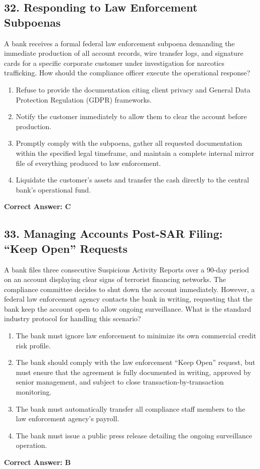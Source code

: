 \documentclass[11pt,a4paper]{article}
\begin{document}
	\subsection{32. Responding to Law Enforcement Subpoenas}
	A bank receives a formal federal law enforcement subpoena demanding the immediate production of all account records, wire transfer logs, and signature cards for a specific corporate customer under investigation for narcotics trafficking. How should the compliance officer execute the operational response?
	\begin{enumerate}[label=\Alph*.]
		\item Refuse to provide the documentation citing client privacy and General Data Protection Regulation (GDPR) frameworks.
		\item Notify the customer immediately to allow them to clear the account before production.
		\item Promptly comply with the subpoena, gather all requested documentation within the specified legal timeframe, and maintain a complete internal mirror file of everything produced to law enforcement.
		\item Liquidate the customer's assets and transfer the cash directly to the central bank's operational fund.
	\end{enumerate}
	\textbf{Correct Answer: C}
	
	\subsection{33. Managing Accounts Post-SAR Filing: ``Keep Open'' Requests}
	A bank files three consecutive Suspicious Activity Reports over a 90-day period on an account displaying clear signs of terrorist financing networks. The compliance committee decides to shut down the account immediately. However, a federal law enforcement agency contacts the bank in writing, requesting that the bank keep the account open to allow ongoing surveillance. What is the standard industry protocol for handling this scenario?
	\begin{enumerate}[label=\Alph*.]
		\item The bank must ignore law enforcement to minimize its own commercial credit risk profile.
		\item The bank should comply with the law enforcement ``Keep Open'' request, but must ensure that the agreement is fully documented in writing, approved by senior management, and subject to close transaction-by-transaction monitoring.
		\item The bank must automatically transfer all compliance staff members to the law enforcement agency's payroll.
		\item The bank must issue a public press release detailing the ongoing surveillance operation.
	\end{enumerate}
	\textbf{Correct Answer: B}
	
\end{document}
